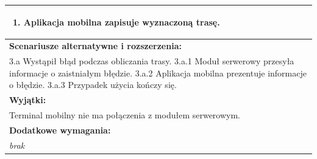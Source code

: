 \begin{center}
\begin{longtable}[h]{|p{1.6cm}|p{13.5cm}|}
{\begin{enumerate}
\item Aplikacja mobilna zapisuje wyznaczoną trasę.
\end{enumerate}
} \\ \hline
\multicolumn{2}{|p{15.1cm}|}{\textbf{Scenariusze alternatywne i rozszerzenia:}} \\
\multicolumn{2}{|p{15.1cm}|}{
3.a Wystąpił błąd podczas obliczania trasy. \newline
3.a.1 Moduł serwerowy przesyła informacje o zaistniałym błędzie. \newline
3.a.2 Aplikacja mobilna prezentuje informacje o błędzie. \newline
3.a.3 Przypadek użycia kończy się.
} \\ \hline
\multicolumn{2}{|p{15.1cm}|}{\textbf{Wyjątki:}} \\
\multicolumn{2}{|p{15.1cm}|}{
Terminal mobilny nie ma połączenia z modułem serwerowym.
} \\ \hline
\multicolumn{2}{|p{15.1cm}|}{\textbf{Dodatkowe wymagania:}} \\
\multicolumn{2}{|p{15.1cm}|}{
\textit{brak}
} \\
\hline
\end{longtable}
\end{center}

